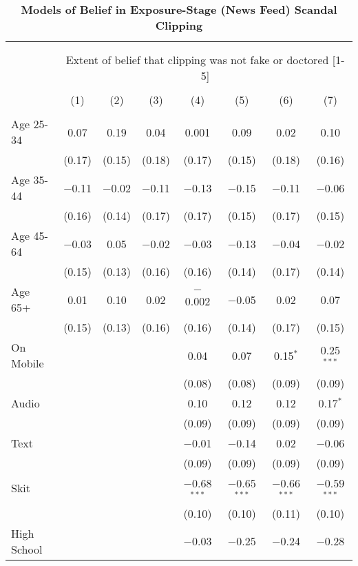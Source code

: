 
\begin{table}[!htbp] \centering 
  \caption{\textbf{Models of Belief in Exposure-Stage (News Feed) Scandal Clipping}} 
  \label{firststage_deception} 
\footnotesize 
\begin{tabular}{@{\extracolsep{1pt}}lccccccc} 
\\[-1.8ex]\hline 
\hline \\[-1.8ex] 
\\[-1.8ex] & \multicolumn{7}{c}{\normalsize Extent of belief that clipping was not fake or doctored [1-5]} \\ 
\\[-1.8ex] & (1) & (2) & (3) & (4) & (5) & (6) & (7)\\ 
\hline \\[-1.8ex] 
 Age 25-34 & 0.07 & 0.19 & 0.04 & 0.001 & 0.09 & 0.02 & 0.10 \\ 
  & (0.17) & (0.15) & (0.18) & (0.17) & (0.15) & (0.18) & (0.16) \\ 
  Age 35-44 & $-$0.11 & $-$0.02 & $-$0.11 & $-$0.13 & $-$0.15 & $-$0.11 & $-$0.06 \\ 
  & (0.16) & (0.14) & (0.17) & (0.17) & (0.15) & (0.17) & (0.15) \\ 
  Age 45-64 & $-$0.03 & 0.05 & $-$0.02 & $-$0.03 & $-$0.13 & $-$0.04 & $-$0.02 \\ 
  & (0.15) & (0.13) & (0.16) & (0.16) & (0.14) & (0.17) & (0.14) \\ 
  Age 65+  & 0.01 & 0.10 & 0.02 & $-$0.002 & $-$0.05 & 0.02 & 0.07 \\ 
  & (0.15) & (0.13) & (0.16) & (0.16) & (0.14) & (0.17) & (0.15) \\ 
  On Mobile &  &  &  & 0.04 & 0.07 & 0.15$^{*}$ & 0.25$^{***}$ \\ 
  &  &  &  & (0.08) & (0.08) & (0.09) & (0.09) \\ 
  Audio &  &  &  & 0.10 & 0.12 & 0.12 & 0.17$^{*}$ \\ 
  &  &  &  & (0.09) & (0.09) & (0.09) & (0.09) \\ 
  Text &  &  &  & $-$0.01 & $-$0.14 & 0.02 & $-$0.06 \\ 
  &  &  &  & (0.09) & (0.09) & (0.09) & (0.09) \\ 
  Skit &  &  &  & $-$0.68$^{***}$ & $-$0.65$^{***}$ & $-$0.66$^{***}$ & $-$0.59$^{***}$ \\ 
  &  &  &  & (0.10) & (0.10) & (0.11) & (0.10) \\ 
  High School &  &  &  & $-$0.03 & $-$0.25 & $-$0.24 & $-$0.28 \\ 

\end{tabular}
\end{table}
